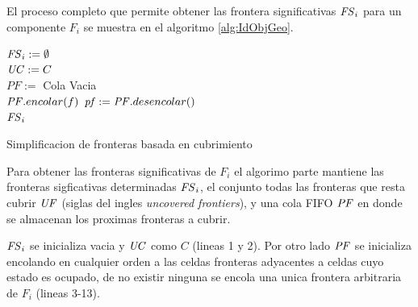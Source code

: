 El proceso completo que permite obtener las frontera significativas
$\mathit{FS}_i$ para un componente $F_i$ se muestra en el algoritmo
\ref{alg:IdObjGeo}.

\begin{algorithm}[H]
\SetAlgoLined
  $\mathit{FS}_i := \emptyset$\\
  $\mathit{UC} := C$ \\

  $PF :=$ Cola Vacia \\
   {
     {
       {
        $\mathit{PF}.encolar(f)$
      }
    }
  }
   {
    $\mathit{pf} := \mathit{PF}.desencolar()$\\
  }
  \Return $\mathit{FS}_i$ 

  \caption{Simplificacion de fronteras basada en cubrimiento}
  \label{alg:IdObjGeo}
\end{algorithm}

Para obtener las fronteras significativas de $F_i$ el algorimo parte mantiene
las fronteras sigficativas determinadas $\mathit{FS}_i$, el conjunto
todas las fronteras que resta cubrir $\mathit{UF}$ (siglas del ingles
\emph{uncovered frontiers}), y  una cola FIFO $\mathit{PF}$ en donde se almacenan 
los proximas fronteras a cubrir.

$\mathit{FS}_i$ se inicializa vacia y $\mathit{UC}$ como $C$ (lineas 1 y 2). Por otro
lado $\mathit{PF}$ se inicializa encolando en cualquier orden a las celdas
fronteras adyacentes a celdas cuyo estado es ocupado, de no existir ninguna se
encola una unica frontera arbitraria de $F_i$ (lineas 3-13). 

